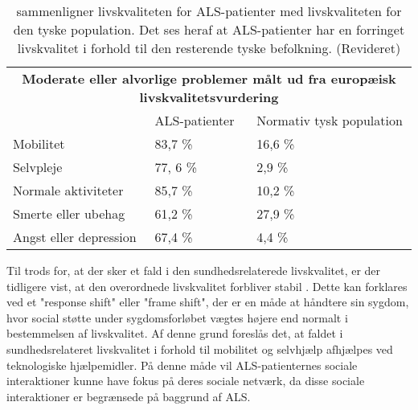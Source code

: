 \begin{table}[H]
\centering
\label{livskvalitet}
\begin{tabular}{l| l| l}
\multicolumn{3}{c}{\textbf{Moderate eller alvorlige problemer målt ud fra europæisk livskvalitetsvurdering}}
   \\
                                                                         & ALS-patienter                                    & Normativ tysk population                                   \\
Mobilitet                                                                & 83,7 \%                                          & 16,6 \%                                                    \\
Selvpleje                                                                & 77, 6 \%                                         & 2,9 \%                                                     \\
Normale aktiviteter                                                      & 85,7 \%                                          & 10,2 \%                                                    \\
Smerte eller ubehag                                                      & 61,2 \%                                          & 27,9 \%                                                    \\
Angst eller depression                                                   & 67,4 \%                                          & 4,4 \%                                                    \\
\end{tabular}
\caption{sammenligner livskvaliteten for ALS-patienter med livskvaliteten for den tyske population. Det ses heraf at ALS-patienter har en forringet livskvalitet i forhold til den resterende tyske befolkning.\citep{ilse2015} (Revideret)}
\end{table}

\noindent
Til trods for, at der sker et fald i den sundhedsrelaterede livskvalitet, er der tidligere vist, at den overordnede livskvalitet forbliver stabil \citep{ilse2015, nuebert2004}. Dette kan forklares ved et "response shift" eller "frame shift", der er en måde at håndtere sin sygdom, hvor social støtte under sygdomsforløbet vægtes højere end normalt i bestemmelsen af livskvalitet. \citep{ilse2015} Af denne grund foreslås det, at faldet i sundhedsrelateret livskvalitet i forhold til mobilitet og selvhjælp afhjælpes ved teknologiske hjælpemidler. På denne måde vil ALS-patienternes sociale interaktioner kunne have fokus på deres sociale netværk, da disse sociale interaktioner er begrænsede på baggrund af ALS. \citep{ilse2015,tramonti2012}







